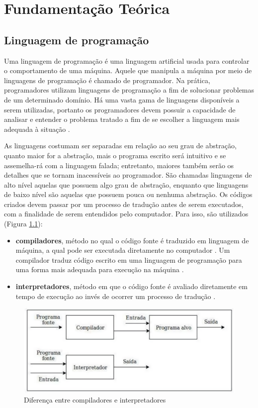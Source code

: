 \chapter{Fundamentação Teórica}



\section{Linguagem de programação}
Uma linguagem de programação é uma linguagem artificial usada para controlar o comportamento de uma máquina. Aquele que manipula a máquina por meio de linguagens de programação é chamado de programador. Na prática, programadores utilizam linguagens de programação a fim de solucionar problemas de um determinado domínio. Há uma vasta gama de linguagens disponíveis a serem utilizadas, portanto os programadores devem possuir a capacidade de analisar e entender o problema tratado a fim de se escolher a linguagem mais adequada à situação \cite{Sebesta2011}. 

As linguagens costumam ser separadas em relação ao seu grau de abstração, quanto maior for a abstração, mais o programa escrito será intuitivo e se assemelha-rá com a linguagem falada; entretanto, maiores também serão os detalhes que se tornam inacessíveis ao programador. São chamadas linguagens de alto nível aquelas que possuem algo grau de abstração, enquanto que linguagens de baixo nível são aquelas que possuem pouca ou nenhuma abstração.
Os códigos criados devem passar por um processo de tradução antes de serem executados, com a finalidade de serem entendidos pelo computador. Para isso, são utilizados (Figura \ref{fig:compilador_interpretador}):
\begin{itemize}
    \item \textbf{compiladores}, método no qual o código fonte é traduzido em linguagem de máquina, a qual pode ser executada diretamente no computador \cite{Sebesta2011}. Um compilador traduz código escrito em uma linguagem de programação para uma forma mais adequada para execução na máquina \cite{Sipser2012-gl}.
    \item \textbf{interpretadores}, método em que o código fonte é avaliado diretamente em tempo de execução ao invés de ocorrer um processo de tradução \cite{Jones2020-iq}.
\end{itemize}

\begin{figure}
    \centering
    \includegraphics[width=1\textwidth]{img/Cap2/compilador_interpretador.png}
    \caption{Diferença entre compiladores e interpretadores \cite{Miotto2019}}
    \label{fig:compilador_interpretador}
\end{figure}


